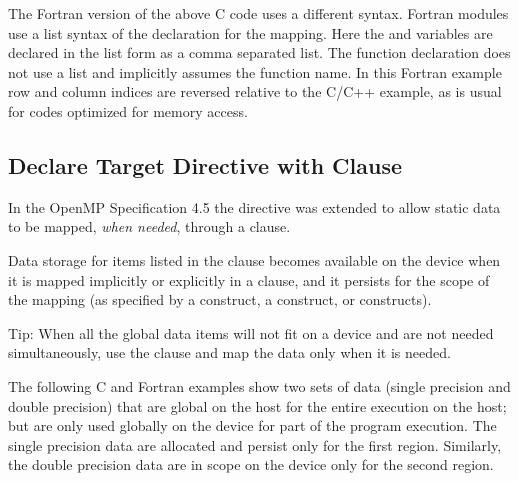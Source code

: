 
The Fortran version of the above C code uses a different syntax. Fortran modules 
use a list syntax of the  declaration for the mapping.
Here the  and  variables are declared in the list form as a comma separated list. 
The function declaration does not use a list and implicitly assumes the function 
name. In this Fortran example row and column indices are reversed relative to the 
C/C++ example, as is usual for codes optimized for memory access.



\subsection{Declare Target Directive with  Clause}
\label{subsec:declare_target_link}




In the OpenMP Specification 4.5 the  directive was extended to allow static
data to be mapped, \emph{when needed}, through a  clause.

Data storage for items listed in the  clause becomes available on the device
when it is mapped implicitly or explicitly in a  clause, and it persists for the scope of
the mapping (as specified by a  construct, 
a  construct, or
 constructs).

Tip: When all the global data items will not fit on a device and are not needed
simultaneously, use the  clause and map the data only when it is needed.

The following C and Fortran examples show two sets of data (single precision and double precision)
that are global on the host for the entire execution on the host; but are only used
globally on the device for part of the program execution. The single precision data
are allocated and persist only for the first  region. Similarly, the
double precision data are in scope on the device only for the second  region.

